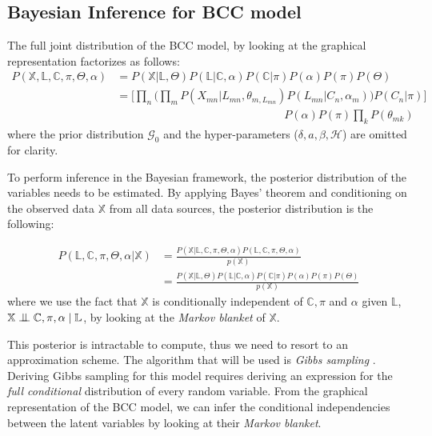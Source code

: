 \subsection{Bayesian Inference for BCC model}\label{integr-bayes-inference-subsect}
The full joint distribution of the BCC model, by looking at the graphical representation factorizes as follows:
\begin{equation}%
  \begin{aligned}
	P(\mathbb{X}, \mathbb{L}, \mathbb{C}, \pi , \Theta , \alpha) & = P(\mathbb{X}|\mathbb{L},\Theta) P(\mathbb{L}|\mathbb{C},\alpha) P(\mathbb{C}|\pi) P(\alpha) P(\pi) P(\Theta) \\
	  & = \bigg[\prod_{n}\bigg(\prod_{m} P(X_{mn}|L_{mn},\theta_{m,L_{mn}}) P(L_{mn}|C_{n},\alpha_{m})\bigg) P(C_{n}|\pi)\bigg] \\
	  & \quad \quad \quad \quad \quad \quad \quad \quad \quad \quad \quad \quad \quad \quad \quad P(\alpha) P(\pi) \prod_{k} P(\theta_{mk})
  \end{aligned}
\end{equation}
where the prior distribution $\mathcal{G}_{0}$ and the hyper-parameters ($\delta, \mathit{a}, \beta, \mathcal{H}$) are omitted for clarity.

To perform inference in the Bayesian framework, the posterior distribution of the variables needs to be estimated. By applying Bayes' theorem and conditioning on the observed data $\mathbb{X}$ from all data sources, the posterior distribution is the following:

\begin{equation}%
	\begin{aligned}
	P(\mathbb{L},\mathbb{C},\pi,\Theta,\alpha | \mathbb{X}) & = \frac{P(\mathbb{X}|\mathbb{L},\mathbb{C},\pi,\Theta,\alpha) P(\mathbb{L},\mathbb{C},\pi,\Theta,\alpha)}{p(\mathbb{X})} \\
	& = \frac{P(\mathbb{X}|\mathbb{L},\Theta) P(\mathbb{L}|\mathbb{C},\alpha) P(\mathbb{C}|\pi) P(\alpha) P(\pi) P(\Theta)}{p(\mathbb{X})}
	\end{aligned}
\end{equation}
where we use the fact that $\mathbb{X}$ is conditionally independent of $\mathbb{C}, \pi$ and $\alpha$ given $\mathbb{L}$, \ie $\mathbb{X} \bigCI \mathbb{C}, \pi, \alpha \mid \mathbb{L}$, by looking at the \emph{Markov blanket} of $\mathbb{X}$. 

This posterior is intractable to compute, thus we need to resort to an approximation scheme. The algorithm that will be used is \emph{Gibbs sampling} \cite{Geman1984}. Deriving Gibbs sampling for this model requires deriving an expression for the \emph{full conditional} distribution of every random variable. From the graphical representation of the BCC model, we can infer the conditional independencies between the latent variables by looking at their \emph{Markov blanket}. 

